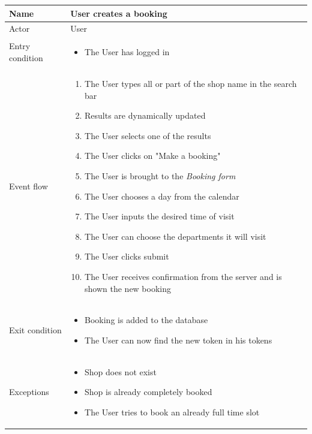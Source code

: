 \begin{table}[H]
    \begin{tabularx}{\textwidth}{|X|p{}|}
    \hline
    Name           & User creates a booking   \\ \hline
    Actor          & User \\ \hline
    Entry condition & \begin{itemize}
        \item The User has logged in
    \end{itemize}\\ \hline
    Event flow     & \begin{enumerate}
        \item The User types all or part of the shop name in the search bar
        \item Results are dynamically updated
        \item The User selects one of the results
        \item The User clicks on "Make a booking"
        \item The User is brought to the \emph{Booking form}
        \item The User chooses a day from the calendar
        \item The User inputs the desired time of visit
        \item The User can choose the departments it will visit
        \item The User clicks submit
        \item The User receives confirmation from the server and is shown the new booking
    \end{enumerate} \\ \hline
    Exit condition & \begin{itemize}
        \item Booking is added to the database
        \item The User can now find the new token in his tokens
    \end{itemize}\\ \hline
    Exceptions & \begin{itemize}
        \item Shop does not exist
        \item Shop is already completely booked
        \item The User tries to book an already full time slot 
    \end{itemize} \\ \hline
    \end{tabularx}
\end{table}

